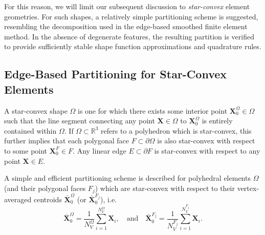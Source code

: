 	For this reason, we will limit our subsequent discussion to \textit{star-convex} element geometries. For such shapes, a relatively simple partitioning scheme is suggested, resembling the decomposition used in the edge-based smoothed finite element method. In the absence of degenerate features, the resulting partition is verified to provide sufficiently stable shape function approximations and quadrature rules.

\subsection*{Edge-Based Partitioning for Star-Convex Elements}

	A star-convex shape $\Omega$ is one for which there exists some interior point $\mathbf{X}^{\Omega}_0 \in \Omega$ such that the line segment connecting any point $\mathbf{X} \in \Omega$ to $\mathbf{X}^{\Omega}_0$ is entirely contained within $\Omega$. If $\Omega \subset \mathbb{R}^3$ refers to a polyhedron which is star-convex, this further implies that each polygonal face $F \subset \partial \Omega$ is also star-convex with respect to some point $\mathbf{X}^{F}_0 \in F$. Any linear edge $E \subset \partial F$ is star-convex with respect to any point $\mathbf{X} \in E$.
	
	A simple and efficient partitioning scheme is described for polyhedral elements $\Omega$ (and their polygonal faces $F_j$) which are star-convex with respect to their vertex-averaged centroids $\bar{\mathbf{X}}^{\Omega}_0$ (or $\bar{\mathbf{X}}^{F_j}_0$), i.e.
	\begin{equation}
		\bar{\mathbf{X}}^{\Omega}_0 = \frac{1}{N^{\Omega}_V} \sum_{i = 1}^{N^{\Omega}_V} \mathbf{X}_{i}, \quad \text{and} \quad \bar{\mathbf{X}}^{F_j}_0 = \frac{1}{N^{F_j}_V} \sum_{i = 1}^{N^{F_j}_V} \mathbf{X}_{i}.
	\end{equation}
	
